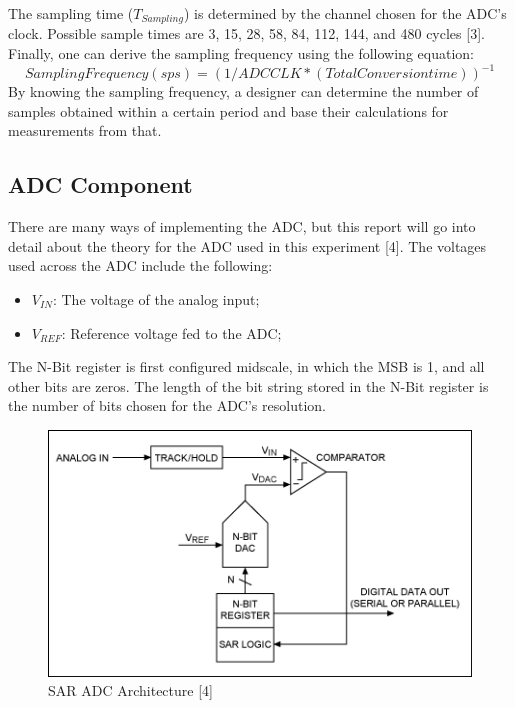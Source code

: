 \documentclass[12pt]{report}
\begin{document}
The sampling time (\(T_{Sampling}\)) is determined by the channel chosen for the ADC's clock. Possible sample times are 3, 15, 28, 58, 84, 112, 144, and 480 cycles [3].\\
Finally, one can derive the sampling frequency using the following equation:
\[ Sampling Frequency (sps) = (1/ADCCLK * (Total Conversion time))^{-1} \]
By knowing the sampling frequency, a designer can determine the number of samples obtained within a certain period and base their calculations for measurements from that.\\
\subsection{ADC Component}
There are many ways of implementing the ADC, but this report will go into detail about the theory
for the ADC used in this experiment [4]. The voltages used across the ADC include the following:\\
\begin{itemize}
	\item \(V_{IN}\): The voltage of the analog input;
	\item \(V_{REF}\): Reference voltage fed to the ADC; 
\end{itemize}
The N-Bit register is first configured midscale, in which the MSB is 1, and all other bits are zeros. The length of the bit string stored in the N-Bit register is the number of bits chosen for the ADC's resolution.\\
\begin{figure}\label{adc}
	\begin{center}
		\includegraphics{adc.png}
		\caption{SAR ADC Architecture [4]}
	\end{center}
\end{figure}
\end{document}
